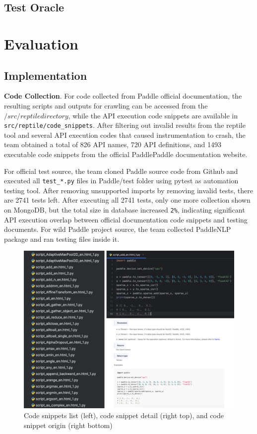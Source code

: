 \documentclass[sigconf]{acmart}
\begin{document}
  \subsection{Test Oracle}


\section{Evaluation}
  \subsection{Implementation}
  \textbf{Code Collection}. For code collected from Paddle official documentation, 
  the resulting scripts and outputs for crawling can be accessed from the $/src/reptile directory$, 
  while the API execution code snippets are available in \verb|src/reptile/code_snippets|. 
  After filtering out invalid results from the reptile tool and several API execution codes that caused instrumentation to crash, 
  the team obtained a total of 826 API names, 720 API definitions, and 1493 executable code snippets from the official PaddlePaddle documentation website.
  \par For official test source, the team cloned Paddle source code from Github and executed all \verb|test_*.py| files in Paddle/test folder using pytest as automation testing tool. 
  After removing unsupported imports by removing invalid tests, there are 2741 tests left. After executing all 2741 tests, only one more collection shown on MongoDB, 
  but the total size in database increased  \verb|2%|, indicating significant API execution overlap between official documentation code snippets and testing documents.
  For wild Paddle project source, the team collected PaddleNLP package and ran testing files inside it.
  
  \begin{figure}[h]
    \centering
    \includegraphics[width=\linewidth]{2.png}
    \caption{Code snippets list (left), code snippet detail (right top), and code snippet origin (right bottom)}
  \end{figure}  
\end{document}
